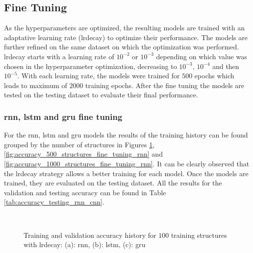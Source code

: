 \documentclass[conference]{IEEEtran}
\begin{document}
\subsection{Fine Tuning}
\label{sec:fine_tuning_results}

As the hyperparameters are optimized, the resulting models are trained with an adaptative learning rate (\gls{lrdecay}) to optimize their performance. The models are further refined on the same dataset on which the optimization was performed. \gls{lrdecay} starts with a learning rate of $10^{-2}$ or $10^{-3}$ depending on which value was chosen in the hyperparameter optimization, decreasing to $10^{-3}$, $10^{-4}$ and then $10^{-5}$. With each learning rate, the models were trained for $ 500 $ epochs which leads to maximum of $ 2000 $ training epochs. After the fine tuning the models are tested on the testing dataset to evaluate their final performance.

\subsubsection{\gls{rnn}, \gls{lstm} and \gls{gru} fine tuning}
\label{sec:rnn_fine_tuning_results}

For the \gls{rnn}, \gls{lstm} and \gls{gru} models the results of the training history can be found grouped by the number of structures in Figures \ref{fig:accuracy_100_structures_fine_tuning_rnn}, \ref{fig:accuracy_500_structures_fine_tuning_rnn} and \ref{fig:accuracy_1000_structures_fine_tuning_rnn}. It can be clearly observed that the \gls{lrdecay} strategy allows a better training for each model. Once the models are trained, they are evaluated on the testing dataset. All the results for the validation and testing accuracy can be found in Table \ref{tab:accuracy_testing_rnn_cnn}.  

\begin{figure}[htp]
	\centering
	\quad
	\\
	\caption{Training and validation accuracy history for $ 100 $ training structures with \gls{lrdecay}: (a): \gls{rnn}, (b): \gls{lstm}, (c): \gls{gru}}
	\label{fig:accuracy_100_structures_fine_tuning_rnn}
\end{figure}
\end{document}
